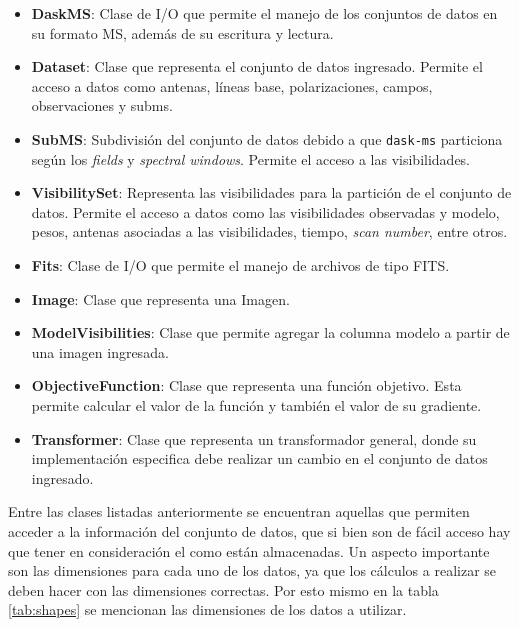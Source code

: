 \begin{itemize}
    \item \textbf{DaskMS}: Clase de I/O que permite el manejo de los conjuntos de datos en su formato MS, además de su escritura y lectura. 
    \item \textbf{Dataset}: Clase que representa el conjunto de datos ingresado. Permite el acceso a datos como antenas, líneas base, polarizaciones, campos, observaciones y subms.  
    \item \textbf{SubMS}: Subdivisión del conjunto de datos debido a que \verb|dask-ms| particiona según los \textit{fields} y \textit{spectral windows}. Permite el acceso a las visibilidades. 
    \item \textbf{VisibilitySet}: Representa las visibilidades para la partición de el conjunto de datos. Permite el acceso a datos como las visibilidades observadas y modelo, pesos, antenas asociadas a las visibilidades, tiempo, \textit{scan number}, entre otros. 
    \item \textbf{Fits}: Clase de I/O que permite el manejo de archivos de tipo FITS.
    \item \textbf{Image}: Clase que representa una Imagen. 
    \item \textbf{ModelVisibilities}: Clase que permite agregar la columna modelo a partir de una imagen ingresada.  
    \item \textbf{ObjectiveFunction}: Clase que representa una función objetivo. Esta permite calcular el valor de la función y también el valor de su gradiente. 
    \item \textbf{Transformer}: Clase que representa un transformador general, donde su implementación especifica debe realizar un cambio en el conjunto de datos ingresado.
\end{itemize}

Entre las clases listadas anteriormente se encuentran aquellas que permiten acceder a la información del conjunto de datos, que si bien son de fácil acceso hay que tener en consideración el como están almacenadas. Un aspecto importante son las dimensiones para cada uno de los datos, ya que los cálculos a realizar se deben hacer con las dimensiones correctas. Por esto mismo en la tabla \ref{tab:shapes} se mencionan las dimensiones de los datos a utilizar. 

